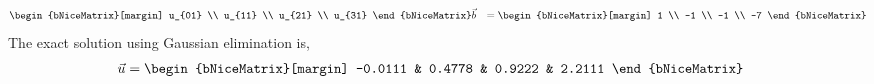 \begin{enumerate}
\begin{align}
\begin{bNiceMatrix}[margin]
                                                   u_{01} \\ u_{11} \\
                                                   u_{21} \\ u_{31}
                                               \end{bNiceMatrix} &
              \vec{b}    & =  \begin{bNiceMatrix}[margin]
                                  1  \\
                                  -1 \\
                                  -1 \\
                                  -7
                              \end{bNiceMatrix}
          \end{align}
          The exact solution using Gaussian elimination is,
          \begin{align}
              \vec{u} & = \begin{bNiceMatrix}[margin]
                              -0.0111 & 0.4778 & 0.9222 & 2.2111
                          \end{bNiceMatrix}
          \end{align}


\end{enumerate}
